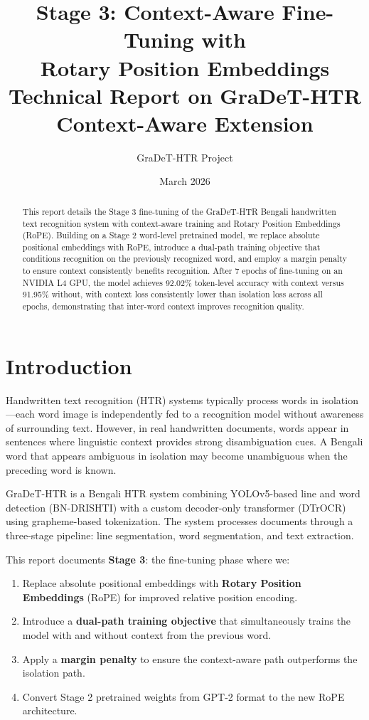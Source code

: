 \documentclass[11pt, a4paper]{article}
\title{\textbf{Stage 3: Context-Aware Fine-Tuning with\\Rotary Position Embeddings}\\[0.5em]
\large Technical Report on GraDeT-HTR Context-Aware Extension}
\author{GraDeT-HTR Project}
\date{March 2026}
\begin{document}
\maketitle

\begin{abstract}
This report details the Stage 3 fine-tuning of the GraDeT-HTR Bengali handwritten text recognition system with context-aware training and Rotary Position Embeddings (RoPE). Building on a Stage 2 word-level pretrained model, we replace absolute positional embeddings with RoPE, introduce a dual-path training objective that conditions recognition on the previously recognized word, and employ a margin penalty to ensure context consistently benefits recognition. After 7 epochs of fine-tuning on an NVIDIA L4 GPU, the model achieves 92.02\% token-level accuracy with context versus 91.95\% without, with context loss consistently lower than isolation loss across all epochs, demonstrating that inter-word context improves recognition quality.
\end{abstract}

\tableofcontents
\newpage

\section{Introduction}

Handwritten text recognition (HTR) systems typically process words in isolation---each word image is independently fed to a recognition model without awareness of surrounding text. However, in real handwritten documents, words appear in sentences where linguistic context provides strong disambiguation cues. A Bengali word that appears ambiguous in isolation may become unambiguous when the preceding word is known.

GraDeT-HTR is a Bengali HTR system combining YOLOv5-based line and word detection (BN-DRISHTI) with a custom decoder-only transformer (DTrOCR) using grapheme-based tokenization. The system processes documents through a three-stage pipeline: line segmentation, word segmentation, and text extraction.

This report documents \textbf{Stage 3}: the fine-tuning phase where we:
\begin{enumerate}
    \item Replace absolute positional embeddings with \textbf{Rotary Position Embeddings} (RoPE) for improved relative position encoding.
    \item Introduce a \textbf{dual-path training objective} that simultaneously trains the model with and without context from the previous word.
    \item Apply a \textbf{margin penalty} to ensure the context-aware path outperforms the isolation path.
    \item Convert Stage 2 pretrained weights from GPT-2 format to the new RoPE architecture.
\end{enumerate}
\end{document}
